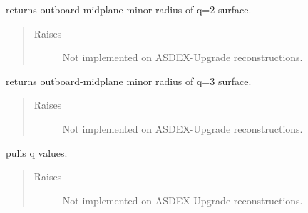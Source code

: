 \documentclass[letterpaper,10pt,english]{sphinxmanual}
\begin{document}
\begin{fulllineitems}

\begin{fulllineitems}
\label{\detokenize{eqtools:eqtools.AUGData.AUGDDData.getQ2Surf}}
returns outboard-midplane minor radius of q=2 surface.
\begin{quote}\begin{description}
\item[{Raises}] \leavevmode
{} \textendash{} Not implemented on ASDEX-Upgrade reconstructions.

\end{description}\end{quote}

\end{fulllineitems}


\begin{fulllineitems}
\label{\detokenize{eqtools:eqtools.AUGData.AUGDDData.getQ3Surf}}
returns outboard-midplane minor radius of q=3 surface.
\begin{quote}\begin{description}
\item[{Raises}] \leavevmode
{} \textendash{} Not implemented on ASDEX-Upgrade reconstructions.

\end{description}\end{quote}

\end{fulllineitems}


\begin{fulllineitems}
\label{\detokenize{eqtools:eqtools.AUGData.AUGDDData.getQs}}
pulls q values.
\begin{quote}\begin{description}
\item[{Raises}] \leavevmode
{} \textendash{} Not implemented on ASDEX-Upgrade reconstructions.


\end{description}
\end{quote}
\end{fulllineitems}
\end{fulllineitems}
\end{document}
